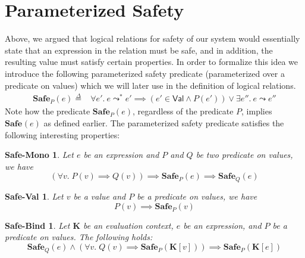 \documentclass{article}
\newcommand{\VAL}{\mathsf{Val}}
\newcommand{\ectx}{\mathbf{K}}
\newcommand{\defeq}{\overset{\Delta}{=}}
\newcommand{\pred}{P}
\newcommand{\predB}{Q}
\newcommand{\expr}{e}
\newcommand{\val}{v}
\newcommand{\step}{\leadsto}
\newcommand{\steps}{\leadsto^*}
\newcommand{\Safe}[1]{\textbf{Safe}_{#1}}
\begin{document}
\section{Parameterized Safety}
\label{sec:safety}

Above, we argued that logical relations for safety of our system would essentially state that an expression in the relation must be safe, and in addition, the resulting value must satisfy certain properties.
In order to formalize this idea we introduce the following parameterized safety predicate (parameterized over a predicate on values) which we will later use in the definition of logical relations.
\begin{align*}
  \Safe{\pred}(\expr) \defeq{}& \forall \expr'.~ \expr \steps \expr' \implies (\expr' \in \VAL \land P(\expr')) \lor \exists \expr''.~\expr \step \expr''
\end{align*}
Note how the predicate $\Safe{\pred}(\expr)$, regardless of the predicate $\pred$, implies $\Safe{}(\expr)$ as defined earlier.
The parameterized safety predicate satisfies the following interesting properties:

\newtheorem*{safevallemma}{Safe-Val}
\newtheorem*{safebindlemma}{Safe-Bind}
\newtheorem*{safesteplemma}{Safe-Step}
\newtheorem*{safemonolemma}{Safe-Mono}

\begin{safemonolemma}
  \makeatletter{}\makeatother
  \label{lem:safemono}
  Let $\expr$ be an expression and $\pred$ and $\predB$ be two predicate on values, we have
  \[(\forall \val.\; \pred(\val) \implies \predB(\val)) \implies \Safe{\pred}(\expr) \implies \Safe{\predB}(\expr)\]
\end{safemonolemma}


\begin{safevallemma}
  \makeatletter{}\makeatother
  \label{lem:safeval}
  Let $\val$ be a value and $\pred$ be a predicate on values, we have
  \[\pred(\val) \implies \Safe{\pred}(\val)\]
\end{safevallemma}

\begin{safebindlemma}
  \makeatletter{}\makeatother
  \label{lem:safebind}
  Let $\ectx$ be an evaluation context, $\expr$ be an expression, and $\pred$ be a predicate on values.
  The following holds:
  \[\Safe{\predB}(\expr) \land (\forall \val.\; \predB(\val) \implies \Safe{\pred}(\ectx[\val])) \implies \Safe{\pred}(\ectx[\expr])\]
\end{safebindlemma}
\end{document}
